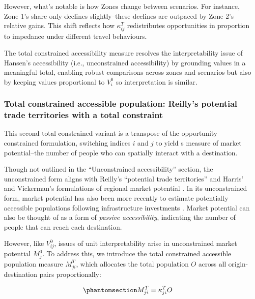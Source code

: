 \documentclass[
  10pt,
  letterpaper,
]{article}
\begin{document}
However, what's notable is how Zones change between scenarios. For
instance, Zone 1's share only declines slightly--these declines are
outpaced by Zone 2's relative gains. This shift reflects how
\(\kappa_{ij}^T\) redistributes opportunities in proportion to impedance
under different travel behaviours.

The total constrained accessibility measure resolves the
interpretability issue of Hansen's accessibility (i.e., unconstrained
accessibility) by grounding values in a meaningful total, enabling
robust comparisons across zones and scenarios but also by keeping values
proportional to \(V_i^0\) so interpretation is similar.

\subsubsection{Total constrained accessible population: Reilly's
potential trade territories with a total
constraint}\label{total-constrained-accessible-population-reillys-potential-trade-territories-with-a-total-constraint}

This second total constrained variant is a transpose of the
opportunity-constrained formulation, switching indices \(i\) and \(j\)
to yield s measure of market potential--the number of people who can
spatially interact with a destination.

Though not outlined in the ``Unconstrained accessibility'' section, the
unconstrained form aligns with Reilly's ``potential trade territories''
\citep{reilly1929methods} and Harris' and Vickerman's formulations of
regional market potential
\citep{harris_market_1954, vickermanAccessibilityAttractionPotential1974}.
In its unconstrained form, market potential has also been more recently
to estimate potentially accessible populations following infrastructure
investments
\citep[e.g.,][]{gutierrezLocationEconomicPotential2001, holl2007twenty, condecco2018road}.
Market potential can also be thought of as a form of \emph{passive
accessibility}, indicating the number of people that can reach each
destination.

However, like \(V_{ij}^0\), issues of unit interpretability arise in
unconstrained market potential \(M_j^0\). To address this, we introduce
the total constrained accessible population measure \(M^T_{ji}\), which
allocates the total population \(O\) across all origin-destination pairs
proportionally:

\begin{equation}\phantomsection\label{eq-total-constrained-market}{
M^T_{ji} = \kappa_{ji}^T O
}\end{equation}
\end{document}
